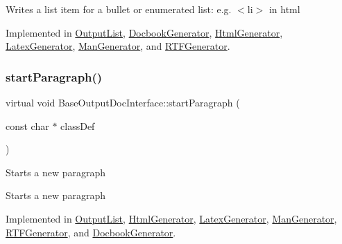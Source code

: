 Writes a list item for a bullet or enumerated list\+: e.\+g. {\ttfamily $<$li$>$} in html 

Implemented in \mbox{\hyperlink{class_output_list_a77e30e9a84b48907b886e8231dbbc20b}{Output\+List}}, \mbox{\hyperlink{class_docbook_generator_a2ee84d2ec43dc1634a71ee3101eab3e4}{Docbook\+Generator}}, \mbox{\hyperlink{class_html_generator_aaa5091e04c77ea310e0c5dee4cc04e94}{Html\+Generator}}, \mbox{\hyperlink{class_latex_generator_ae7a65542a815c62b5a55283fcc68d774}{Latex\+Generator}}, \mbox{\hyperlink{class_man_generator_a83d776971ea058ea021d49df05f4e563}{Man\+Generator}}, and \mbox{\hyperlink{class_r_t_f_generator_ae09155b5cf6fb7457ae598f22d65d045}{R\+T\+F\+Generator}}.

\mbox{\label{class_base_output_doc_interface_a9f711f4ef8f48b9c7b1cae625578e7ff}} 
\subsubsection{\texorpdfstring{startParagraph()}{startParagraph()}}
{\footnotesize\ttfamily virtual void Base\+Output\+Doc\+Interface\+::start\+Paragraph (\begin{DoxyParamCaption}\item[{const char $\ast$}]{class\+Def }\end{DoxyParamCaption})\hspace{0.3cm}{\ttfamily [pure virtual]}}

Starts a new paragraph

Starts a new paragraph 

Implemented in \mbox{\hyperlink{class_output_list_a809351ce4027f4fc083cfb68d5e740eb}{Output\+List}}, \mbox{\hyperlink{class_html_generator_ab00abe0fbb8b668d3f8fd73b7c1216b0}{Html\+Generator}}, \mbox{\hyperlink{class_latex_generator_a467ae3fdba818b4efaefb168455c4796}{Latex\+Generator}}, \mbox{\hyperlink{class_man_generator_a311b0dd8edecddbfa0473c5e43a97e73}{Man\+Generator}}, \mbox{\hyperlink{class_r_t_f_generator_a98ea7dff7770c95c08f7f82dc872881b}{R\+T\+F\+Generator}}, and \mbox{\hyperlink{class_docbook_generator_aa9920dace623a31301f5c7b9f5f739b8}{Docbook\+Generator}}.

\mbox{\label{class_base_output_doc_interface_abde41a60b900d35b0b198f43731c1cd0}} 
